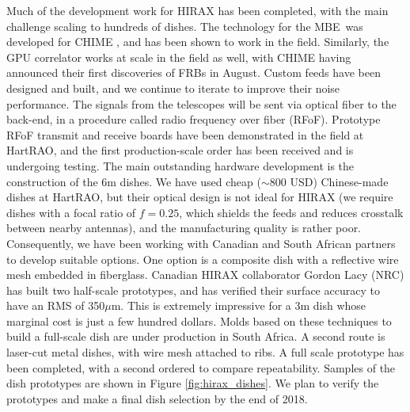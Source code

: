 \documentclass[letterpaper,11pt,preprint]{aastex}
\newcommand{\mbe}{{\rm MBE}}
\begin{document}


Much of the development work for HIRAX has been completed, with the
main challenge scaling to hundreds of dishes.  The technology for the
\mbe\ was developed for CHIME \citep{Bandura16}, and has been shown to
work in the field.  Similarly, the GPU correlator \citep{Recnik15}
works at scale in the field as well, with CHIME having announced their
first discoveries of FRBs in August\citep{CHIME_ATEL}.  Custom feeds
have been designed and built, and we continue to iterate to improve
their noise performance.  The signals from the telescopes will be sent
via optical fiber to the back-end, in a procedure called radio
frequency over fiber (RFoF).  Prototype RFoF transmit and receive
boards have been demonstrated in the field at HartRAO, and the first
production-scale order has been received and is undergoing testing.
The main outstanding hardware development is the construction of the
6m dishes.  We have used cheap ($\sim$800 USD) Chinese-made dishes at
HartRAO, but their optical design is not ideal for HIRAX (we require
dishes with a focal ratio of $f=0.25$, which shields the feeds and
reduces crosstalk between nearby antennas), and the
manufacturing quality is rather poor.  Consequently, we have been
working with Canadian and South African partners to develop suitable
options.  One option is a composite dish with a reflective wire mesh
embedded in fiberglass.  Canadian HIRAX collaborator Gordon Lacy (NRC)
has built two half-scale prototypes, and has verified their surface
accuracy to have an RMS of 350$\mu$m.  This is extremely impressive
for a 3m dish whose marginal cost is just a few hundred dollars.
Molds based on these techniques to build a full-scale dish are 
under production in South Africa.  A second route is laser-cut metal
dishes, with wire mesh attached to ribs. A full scale prototype has
been completed, with a second ordered to compare repeatability.
Samples of the dish prototypes are shown in Figure
\ref{fig:hirax_dishes}.  We plan to verify the prototypes and make a
final dish selection by the end of 2018.  
\end{document}

